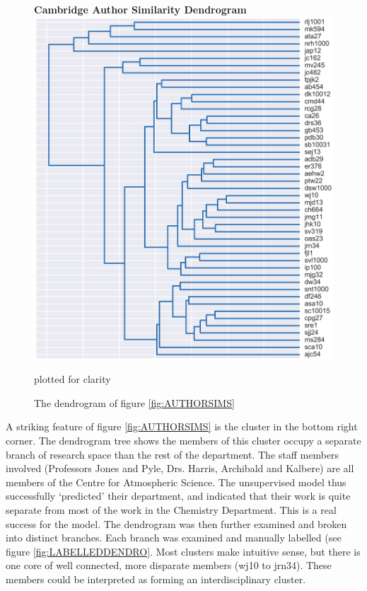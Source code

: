 \begin{center}
\begin{figure}[H]
  \centering
  \textbf{Cambridge Author Similarity Dendrogram}
    \includegraphics[width=\textwidth]{Analysis/dendro.png}
    \caption[Cambridge Author Similarity Dendrogram]{The dendrogram of figure \ref{fig:AUTHORSIMS}} plotted for clarity
\end{figure} 
\label{fig:DENDRO}

\end{center}
A striking feature of figure \ref{fig:AUTHORSIMS} is the cluster in the bottom right corner. The dendrogram tree shows the members of this cluster occupy a separate branch of research space than the rest of the department. The staff members involved (Professors Jones and Pyle, Drs. Harris, Archibald and Kalbere) are all members of the Centre for Atmospheric Science. The unsupervised model thus successfully `predicted' their department, and indicated that their work is quite separate from most of the work in the Chemistry Department. This is a real success for the model. The dendrogram was then further examined and broken into distinct branches. Each branch was examined and manually labelled (see figure \ref{fig:LABELLEDDENDRO}. Most clusters make intuitive sense, but there is one core of well connected, more disparate members (wj10 to jrn34). These members could be interpreted as forming an interdisciplinary cluster.  
